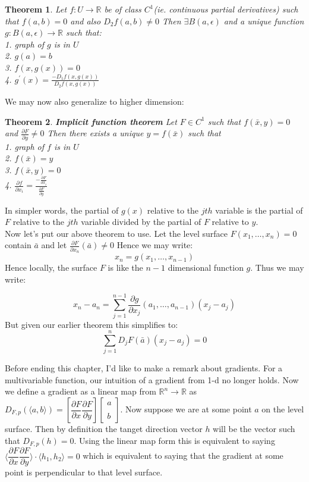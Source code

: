 \documentclass[titlepage]{article}
\newtheorem{theorem}{Theorem}[section]
\newcommand{\Rn}{\mathbb{R}^n}
\begin{document}
\begin{theorem}
Let $f: U \to \mathbb{R}$ be of class $C^{1}$(ie. continuous partial derivatives) such that $f(a,b) = 0$ and also $D_{2}f(a,b) \not = 0$ Then $\exists B(a,\epsilon)$ and a unique function $g: B(a,\epsilon) \to \mathbb{R}$ such that:
\\
1. graph of $g$ is in $U$
\\
2. $g(a) = b$
\\
3. $f(x,g(x)) =0$
\\
4. $g^{\prime}(x) = \frac{-D_{1}f(x,g(x))}{D_{2}f(x,g(x))}$
\end{theorem}

We may now also generalize to higher dimension:

\begin{theorem} \textbf{Implicit function theorem}
Let $F \in C^{1}$ such that $f(\bar{x},y)=0$ and $\frac{\partial F}{\partial y} \not=0$ Then there exists a unique $y = f(\bar{x})$ such that
\\
1. graph of $f$ is in $U$
\\
2. $f(\bar{x}) = y$
\\
3. $f(\bar{x},y) =0$
\\
4. $\frac{\partial f}{\partial x_{i}} = \frac{ - \frac{\partial F}{\partial x_{i}}}{\frac{  \partial F}{\partial y}}$
\end{theorem}

In simpler words, the partial of $g(x)$ relative to the $jth$ variable is the partial of $F$ relative to the $jth$ variable divided by the partial of $F$ relative to $y$. 
\\

Now let's put our above theorem to use. Let the level surface $F(x_{1},\ldots, x_{n}) = 0$ contain $\bar{a}$ and let $\frac{\partial F}{\partial x_{n}}(\bar{a}) \not = 0$ Hence we may write:
$$x_{n} = g(x_{1},\ldots,x_{n-1})$$ Hence locally, the surface $F$ is like the $n-1$ dimensional function $g$. Thus we may write:

$$x_{n}-a_{n} = \sum_{j=1}^{n-1} \frac{\partial g}{\partial x_{j}} (a_{1},\ldots, a_{n-1})(x_{j}-a_{j})$$ But given our earlier theorem this simplifies to:
$$\sum_{j=1}^{n} D_{j}F(\bar{a})(x_{j}-a_{j}) = 0 $$

Before ending this chapter, I'd like to make a remark about gradients. For a multivariable function, our intuition of a gradient from 1-d no longer holds. Now we define a gradient as a linear map from $\Rn \to \mathbb{R}$ as $D_{F,p}(\langle a,b \rangle) = [ \dfrac{\partial F}{\partial x} \dfrac{\partial F}{\partial y}] \begin{bmatrix}a \\\\ b\end{bmatrix}$. Now suppose we are at some point $a$ on the level surface. Then by definition the tanget direction vector $h$ will be the vector such that $D_{F,p}(h) = 0$. Using the linear map form this is equivalent to saying $\langle \dfrac{\partial F}{\partial x} \dfrac{\partial F}{\partial y} \rangle \cdot \langle h_{1}, h_{2}\rangle = 0$ which is equivalent to saying that the gradient at some point is perpendicular to that level surface.
\end{document}
